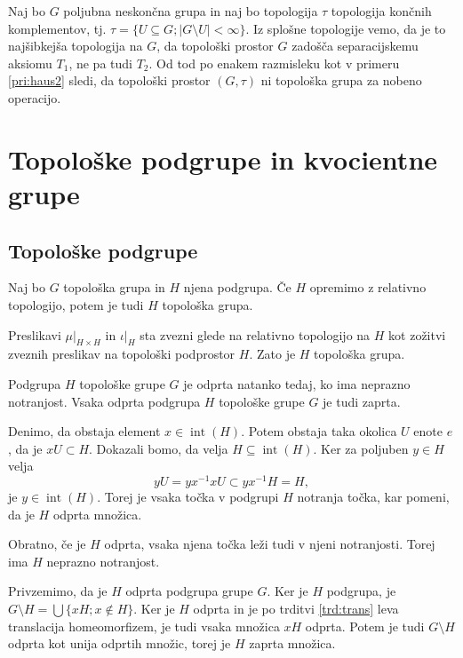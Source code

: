 \documentclass[mat1]{fmfdelo}
\DeclareMathOperator{\interior}{int}
\begin{document}
\begin{primer}
Naj bo $G$ poljubna neskončna grupa in naj bo topologija $\tau$ topologija končnih komplementov, tj. $\tau = \lbrace U \subseteq G ; |G\setminus U| < \infty \rbrace$.
Iz splošne topologije vemo, da je to najšibkejša topologija na $G$, da topološki prostor $G$ zadošča separacijskemu aksiomu $T_1$, ne pa tudi $T_2$. Od tod po enakem razmisleku kot v primeru \ref{pri:haus2} sledi, da topološki prostor $(G, \tau)$ ni topološka grupa za nobeno operacijo.
\end{primer}

\section{Topološke podgrupe in kvocientne grupe}

\subsection{Topološke podgrupe}

\begin{trditev}\label{trd:toppodgrupa}
Naj bo $G$ topološka grupa in $H$ njena podgrupa. Če $H$ opremimo z relativno topologijo, potem je tudi $H$ topološka grupa.
\end{trditev}

\begin{dokaz}
Preslikavi $\mu|_{H \times H}$ in $\iota|_H$ sta zvezni glede na relativno topologijo na $H$ kot zožitvi zveznih preslikav na topološki podprostor $H$. Zato je $H$ topološka grupa.
\end{dokaz}


\begin{trditev}\label{trd:odpzap}
Podgrupa $H$ topološke grupe $G$ je odprta natanko tedaj, ko ima ne\-praz\-no not\-ran\-jost. Vsaka odprta podgrupa $H$ topološke grupe $G$ je tudi zaprta.
\end{trditev}

\begin{dokaz}
Denimo, da obstaja element $x \in \interior(H)$. Potem obstaja taka okolica $U$ enote $e$, da je $xU \subset H$. Dokazali bomo, da velja $H \subseteq \interior(H)$. Ker za poljuben $y \in H$ velja \[yU = yx^{-1}xU \subset yx^{-1}H = H,\] je $y \in \interior(H)$. Torej je vsaka točka v podgrupi $H$ notranja točka, kar pomeni, da je $H$ odprta množica.

Obratno, če je $H$ odprta, vsaka njena točka leži tudi v njeni notranjosti. Torej ima $H$ neprazno notranjost.

Privzemimo, da je $H$ odprta podgrupa grupe $G$. Ker je $H$ podgrupa, je $G\setminus H = \bigcup \lbrace xH ; x \notin H \rbrace$. Ker je $H$ odprta in je po trditvi \ref{trd:trans} leva translacija homeomorfizem, je tudi vsaka množica $xH$ odprta. Potem je tudi $G \setminus H$ odprta kot unija odprtih množic, torej je $H$ zaprta množica.
\end{dokaz}
\end{document}
